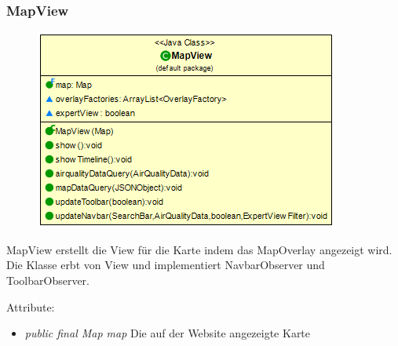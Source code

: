 \subsubsection{MapView}
\begin{minipage}{0.5\textwidth}
    \begin{figure}[H]
        {\centering\includegraphics[scale = 0.5
        ]{media/view/view/MapView_Class.png}}
    \end{figure}
    \end{minipage} \hfill
    \begin{minipage}{0.4\textwidth}
MapView erstellt die View für die Karte indem das MapOverlay angezeigt wird. Die Klasse erbt von View und implementiert NavbarObserver und ToolbarObserver.
\end{minipage}
Attribute: \begin{itemize} [noitemsep]
     \item \emph{public final Map map} Die auf der Website angezeigte Karte
\end{itemize}
